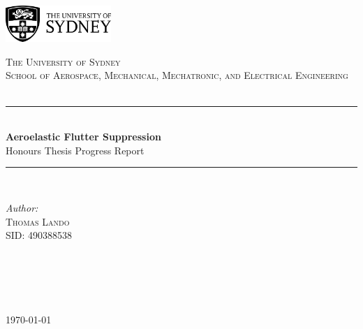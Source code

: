 \documentclass[a4paper,11pt]{article}
\title{}
\begin{document}
\begin{titlepage}

\newcommand{\HRule}{\rule{\linewidth}{0.5mm}} 
\begin{flushright}
\includegraphics[width=0.3\textwidth]{Images/usydNew.png}\\[2cm]
\end{flushright}

\center 

\textsc{\LARGE The University of Sydney}\\[0.75cm]
\textsc{\Large School of Aerospace, Mechanical, Mechatronic, and Electrical Engineering}\\[1cm]

\textsc{\Large}\\[0.25cm] 

\HRule \\[0.4cm]
{ \huge \bfseries Aeroelastic Flutter Suppression}\\[0.4cm] 
{\Large Honours Thesis Progress Report}\\[0.4cm]
\HRule \\[1.25cm]

\begin{minipage}{0.4\textwidth}
\begin{flushleft}
\emph{Author:}\\
\textsc{Thomas Lando}\\{SID: 490388538}\\[0.2cm]

\end{flushleft}
\end{minipage}
~
\begin{minipage}{0.4\textwidth}
\begin{flushright}\large\emph{}\\
\end{flushright}
\end{minipage}\\[0.8cm]
\vfill
{\large \today}\\[0.8cm]


\vfill
\end{titlepage}
\end{document}
